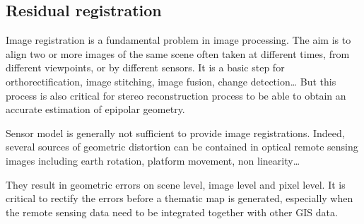\subsection{Residual registration}\label{ssec:registration}

Image registration is a fundamental problem in image processing. The aim is to
align two or more images of the same scene often taken at different times, from
different viewpoints, or by different sensors. It is a basic step for
orthorectification, image stitching, image fusion, change detection\ldots
But this process is also critical for stereo reconstruction process to be able
to obtain an accurate estimation of epipolar geometry.

Sensor model is generally not sufficient to provide image registrations. Indeed,
several sources of geometric distortion can be contained in optical remote
sensing images including earth rotation, platform movement, non linearity\ldots

They result in geometric errors on scene level, image level and pixel level. It
is critical to rectify the errors before a thematic map is generated, especially
when the remote sensing data need to be integrated together with other GIS data.

